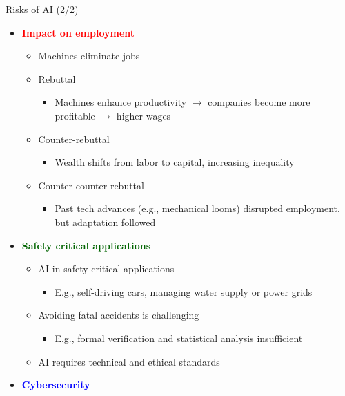 \documentclass[
  10pt,
  ignorenonframetext,
]{beamer}
\providecommand{\tightlist}{%
  \setlength{\itemsep}{0pt}\setlength{\parskip}{0pt}}
\begin{document}
\begin{frame}{Risks of AI (2/2)}
\label{risks-of-ai-22}
\begin{itemize}
\tightlist
\item
  \textbf{\textcolor{red}{Impact on employment}}

  \begin{itemize}
  \tightlist
  \item
    Machines eliminate jobs
  \item
    Rebuttal

    \begin{itemize}
    \tightlist
    \item
      Machines enhance productivity \(\to\) companies become more
      profitable \(\to\) higher wages
    \end{itemize}
  \item
    Counter-rebuttal

    \begin{itemize}
    \tightlist
    \item
      Wealth shifts from labor to capital, increasing inequality
    \end{itemize}
  \item
    Counter-counter-rebuttal

    \begin{itemize}
    \tightlist
    \item
      Past tech advances (e.g., mechanical looms) disrupted employment,
      but adaptation followed
    \end{itemize}
  \end{itemize}
\item
  \textbf{\textcolor{darkgreen}{Safety critical applications}}

  \begin{itemize}
  \tightlist
  \item
    AI in safety-critical applications

    \begin{itemize}
    \tightlist
    \item
      E.g., self-driving cars, managing water supply or power grids
    \end{itemize}
  \item
    Avoiding fatal accidents is challenging

    \begin{itemize}
    \tightlist
    \item
      E.g., formal verification and statistical analysis insufficient
    \end{itemize}
  \item
    AI requires technical and ethical standards
  \end{itemize}
\item
  \textbf{\textcolor{blue}{Cybersecurity}}


\end{itemize}
\end{frame}
\end{document}
